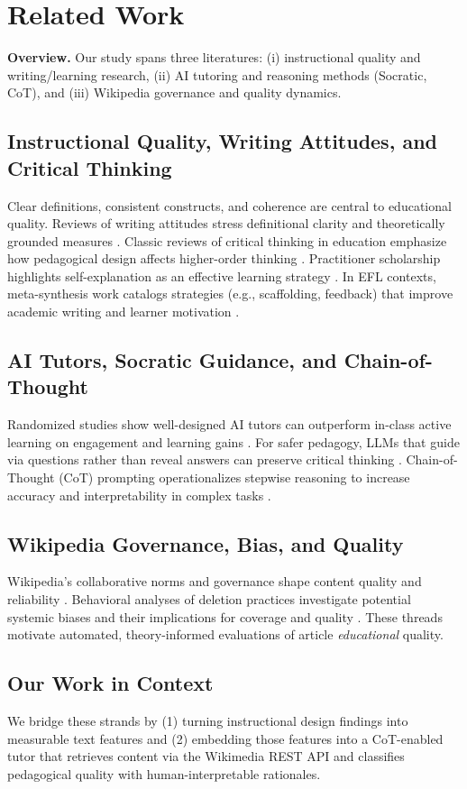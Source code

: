 \section{Related Work}


\textbf{Overview.} Our study spans three literatures: (i) instructional quality and writing/learning research, (ii) AI tutoring and reasoning methods (Socratic, CoT), and (iii) Wikipedia governance and quality dynamics.

\subsection{Instructional Quality, Writing Attitudes, and Critical Thinking}
Clear definitions, consistent constructs, and coherence are central to educational quality. Reviews of writing attitudes stress definitional clarity and theoretically grounded measures \cite{ekholm2018clarifying}. Classic reviews of critical thinking in education emphasize how pedagogical design affects higher-order thinking \cite{pithers2000critical}. Practitioner scholarship highlights self-explanation as an effective learning strategy \cite{catlr2019selfexplanation}. In EFL contexts, meta-synthesis work catalogs strategies (e.g., scaffolding, feedback) that improve academic writing and learner motivation \cite{fadhly2022efl}.

\subsection{AI Tutors, Socratic Guidance, and Chain-of-Thought}
Randomized studies show well-designed AI tutors can outperform in-class active learning on engagement and learning gains \cite{kestin2025aitutor}. For safer pedagogy, LLMs that guide via questions rather than reveal answers can preserve critical thinking \cite{ding2024socratic}. Chain-of-Thought (CoT) prompting operationalizes stepwise reasoning to increase accuracy and interpretability in complex tasks \cite{ibm2025cot}.

\subsection{Wikipedia Governance, Bias, and Quality}
Wikipedia’s collaborative norms and governance shape content quality and reliability \cite{reagle2010good}. Behavioral analyses of deletion practices investigate potential systemic biases and their implications for coverage and quality \cite{worku2020exploring}. These threads motivate automated, theory-informed evaluations of article \emph{educational} quality.

\subsection{Our Work in Context}
We bridge these strands by (1) turning instructional design findings into measurable text features and (2) embedding those features into a CoT-enabled tutor that retrieves content via the Wikimedia REST API and classifies pedagogical quality with human-interpretable rationales.
